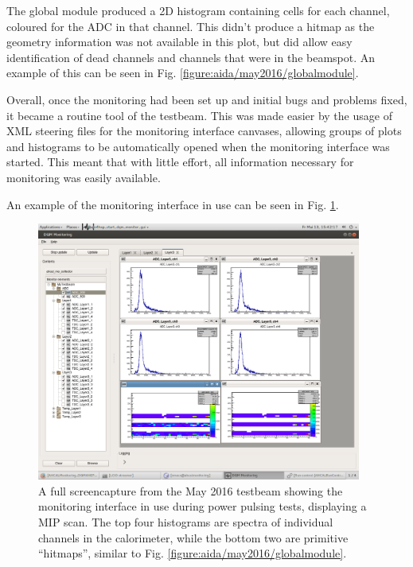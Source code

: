The global module produced a 2D histogram containing cells for each channel, coloured for the \acrshort{ADC} in that channel. This didn't produce a hitmap as the geometry information was not available in this plot, but did allow easy identification of dead channels and channels that were in the beamspot. An example of this can be seen in Fig. \ref{figure:aida/may2016/globalmodule}.

Overall, once the monitoring had been set up and initial bugs and problems fixed, it became a routine tool of the testbeam. This was made easier by the usage of \acrshort{XML} steering files for the monitoring interface canvases, allowing groups of plots and histograms to be automatically opened when the monitoring interface was started. This meant that with little effort, all information necessary for monitoring was easily available.

An example of the monitoring interface in use can be seen in Fig. \ref{figure:aida/may2016/overview}.

\begin{figure}[t]
	\centering
	\includegraphics[width=0.95\textwidth]{../Pictures/PowerPulsingMipScans-May2016.png}
	\caption{A full screencapture from the May 2016 testbeam showing the monitoring interface in use during power pulsing tests, displaying a \acrshort{MIP} scan. The top four histograms are spectra of individual channels in the calorimeter, while the bottom two are primitive ``hitmaps'', similar to Fig. \ref{figure:aida/may2016/globalmodule}.}
	\label{figure:aida/may2016/overview}
\end{figure}

